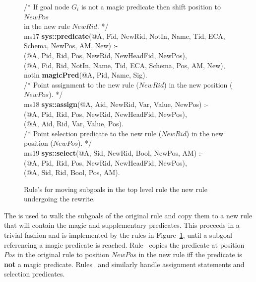 \begin{figure}[!t]
\ssp
\centering
\begin{boxedminipage}{\linewidth}
/* If goal node $G_i$ is not a magic predicate then shift position to $NewPos$  \\
   in the new rule $NewRid$. */ \\
ms17 {\bf sys::predicate}(@A, Fid, NewRid, NotIn, Name, Tid, ECA, Schema, NewPos, AM, New) :- \\
(@A, Pid, Rid, Pos, NewRid, NewHeadFid, NewPos), \\
(@A, Fid, Rid, NotIn, Name, Tid, ECA, Schema, Pos, AM, New), \\
\datalogspace notin {\bf magicPred}(@A, Pid, Name, Sig). \\
	
/* Point assignment to the new rule ($NewRid$) in the new position ($NewPos$). */ \\
ms18 {\bf sys::assign}(@A, Aid, NewRid, Var, Value, NewPos) :- \\
(@A, Pid, Rid, Pos, NewRid, NewHeadFid, NewPos), \\
(@A, Aid, Rid, Var, Value, Pos). \\
	
/* Point selection predicate to the new rule ($NewRid$) in the new position ($NewPos$). */ \\
ms19 {\bf sys::select}(@A, Sid, NewRid, Bool, NewPos, AM) :- \\
(@A, Pid, Rid, Pos, NewRid, NewHeadFid, NewPos), \\
(@A, Sid, Rid, Bool, Pos, AM).

\end{boxedminipage}
\caption{\label{ch:magic:fig:rewrite3} Rule's for moving subgoals in the top level rule
the new rule undergoing the rewrite. }
\end{figure}

The  is used to walk the subgoals of the original rule and copy
them to a new rule that will contain the magic and supplementary predicates.
This proceeds in a trivial fashion and is implemented by the rules in
Figure~\ref{ch:magic:fig:rewrite3}, until a subgoal referencing a magic
predicate is reached.  Rule~ copies the predicate at position $Pos$ in
the original rule to position $NewPos$ in the new rule iff the predicate is
{\bf not} a magic predicate.  Rules~ and  similarly handle
assignment statements and selection predicates.


